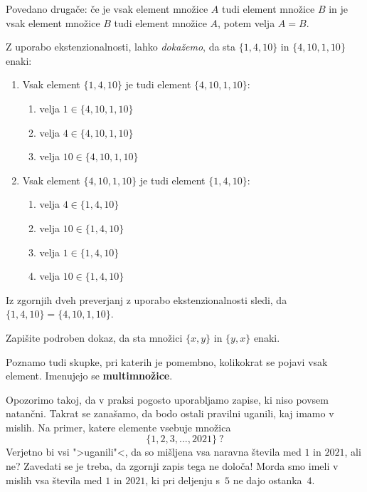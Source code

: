 Povedano drugače: če je vsak element množice $A$ tudi element množice $B$ in je vsak element množice $B$ tudi element množice $A$, potem velja $A = B$.

Z uporabo ekstenzionalnosti, lahko \emph{dokažemo}, da sta $\{1, 4, 10\}$ in $\{4, 10, 1, 10\}$ enaki:
%
\begin{enumerate}
\item 
  Vsak element $\{1, 4, 10\}$ je tudi element $\{4, 10, 1, 10\}$:
  \begin{enumerate}
    \item velja $1 \in \{4, 10, 1, 10\}$
    \item velja $4 \in \{4, 10, 1, 10\}$
    \item velja $10 \in \{4, 10, 1, 10\}$
  \end{enumerate}
\item
Vsak element $\{4, 10, 1, 10\}$ je tudi element $\{1, 4, 10\}$:
  \begin{enumerate}
     \item velja $4 \in \{1, 4, 10\}$
     \item velja $10 \in \{1, 4, 10\}$
     \item velja $1 \in \{1, 4, 10\}$
     \item velja $10 \in \{1, 4, 10\}$
  \end{enumerate}
\end{enumerate}

Iz zgornjih dveh preverjanj z uporabo ekstenzionalnosti sledi, da $\{1, 4, 10\} = \{4, 10, 1, 10\}$.

\begin{naloga}
  Zapišite podroben dokaz, da sta množici $\{x, y\}$ in $\{y, x\}$ enaki.
\end{naloga}

\begin{opomba}
  Poznamo tudi skupke, pri katerih je pomembno, kolikokrat se pojavi vsak element. Imenujejo se \textbf{multimnožice}.
\end{opomba}

Opozorimo takoj, da v praksi pogosto uporabljamo zapise, ki niso povsem natančni. Takrat se zanašamo, da bodo ostali pravilni uganili, kaj imamo v mislih. Na primer, katere elemente vsebuje množica
%
\begin{equation*}
    \{1, 2, 3, ..., 2021\} \ ?
\end{equation*}
%
Verjetno bi vsi ">uganili"<, da so mišljena vsa naravna števila med $1$ in $2021$, ali ne? Zavedati se je treba, da zgornji zapis tega ne določa! Morda smo imeli v mislih vsa števila med $1$ in $2021$, ki pri deljenju s~$5$ ne dajo ostanka~$4$.

